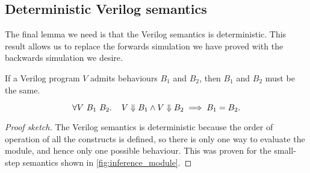 
\subsection{Deterministic Verilog semantics}%
\label{sec:proof:deterministic}

The final lemma we need is that the Verilog semantics is deterministic. This
result allows us to replace the forwards simulation we have proved with the
backwards simulation we desire.

\begin{lemma}\label{lemma:deterministic}
  If a Verilog program $V\!$ admits behaviours $B_1$ and $B_2$, then $B_1$ and
  $B_2$ must be the same.

  \begin{equation*}
    \forall V\ B_{1}\ B_{2}\ldotp\quad V \Downarrow B_{1} \land V \Downarrow B_{2} \implies B_{1} = B_{2}.
  \end{equation*}
\end{lemma}

\begin{proof}[Proof sketch]
  The Verilog semantics is deterministic because the order of operation of all
  the constructs is defined, so there is only one way to evaluate the module,
  and hence only one possible behaviour. This was proven for the small-step
  semantics shown in \cref{fig:inference_module}.
\end{proof}

